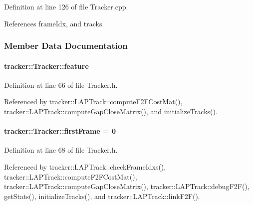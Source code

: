 Definition at line 126 of file Tracker.\+cpp.



References frame\+Idx, and tracks.



\subsubsection{Member Data Documentation}
\paragraph[{\texorpdfstring{feature}{feature}}]{ tracker\+::\+Tracker\+::feature}\hypertarget{classtracker_1_1Tracker_ab9d6c09e4ae84ff482cd21cc32878138}{}\label{classtracker_1_1Tracker_ab9d6c09e4ae84ff482cd21cc32878138}


Definition at line 66 of file Tracker.\+h.



Referenced by tracker\+::\+L\+A\+P\+Track\+::compute\+F2\+F\+Cost\+Mat(), tracker\+::\+L\+A\+P\+Track\+::compute\+Gap\+Close\+Matrix(), and initialize\+Tracks().

\paragraph[{\texorpdfstring{first\+Frame}{firstFrame}}]{ tracker\+::\+Tracker\+::first\+Frame = 0}\hypertarget{classtracker_1_1Tracker_a3ba78a0a502bd2ac432601fc204e3ba1}{}\label{classtracker_1_1Tracker_a3ba78a0a502bd2ac432601fc204e3ba1}


Definition at line 68 of file Tracker.\+h.



Referenced by tracker\+::\+L\+A\+P\+Track\+::check\+Frame\+Idxs(), tracker\+::\+L\+A\+P\+Track\+::compute\+F2\+F\+Cost\+Mat(), tracker\+::\+L\+A\+P\+Track\+::compute\+Gap\+Close\+Matrix(), tracker\+::\+L\+A\+P\+Track\+::debug\+F2\+F(), get\+Stats(), initialize\+Tracks(), and tracker\+::\+L\+A\+P\+Track\+::link\+F2\+F().

